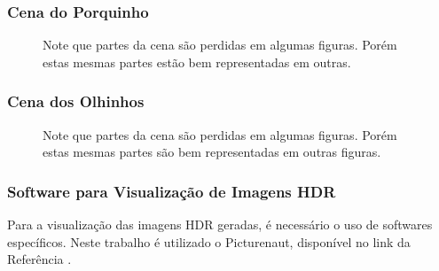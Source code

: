 \subsubsection{Cena do Porquinho} \label{cenaPorquinho}


\begin{figure}[H]
  \quad %
  \quad %
  \quad %
  \caption{Note que partes da cena são perdidas em algumas figuras. Porém estas mesmas partes estão bem representadas em outras.}
  \label{figBasePorquinho}
\end{figure}


\subsubsection{Cena dos Olhinhos} \label{cenaOlhinhos}

\begin{figure}[H]
  \quad %
  \quad %
  \quad %
  \quad %
  \caption{Note que partes da cena são perdidas em algumas figuras. Porém estas mesmas partes são bem representadas em outras figuras.}
  \label{figBaseOlhinhos}
\end{figure}

\subsubsection{Software para Visualização de Imagens HDR}

Para a visualização das imagens HDR geradas, é necessário o uso de softwares específicos. Neste trabalho é utilizado o Picturenaut, disponível no link da Referência \cite{picturenaut}.
